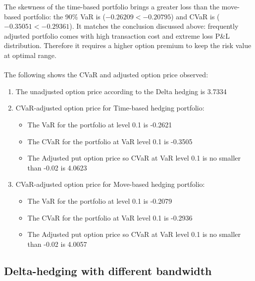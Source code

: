 \documentclass[12pt]{article}
\begin{document}
The skewness of the time-based portfolio brings a greater loss than the move-based portfolio: the 90\% VaR is ($-0.26209< -0.20795$) and CVaR is ($-0.35051<-0.29361$). It matches the conclusion discussed above: frequently adjusted portfolio comes with high transaction cost and extreme loss P\&L 
distribution. Therefore it requires a higher option premium to keep the risk value at optimal range. 
\\\\
The following shows the CVaR and adjusted option price observed: 
\begin{enumerate}

  \item The unadjusted option price according to the Delta hedging is 3.7334
  \item CVaR-adjusted option price for Time-based hedging portfolio:

  \begin{itemize}

    \item The VaR for the portfolio at level 0.1 is -0.2621
    \item The CVaR for the portfolio at VaR level 0.1 is  -0.3505
    \item The Adjusted put option price so CVaR at VaR level 0.1 is no smaller than -0.02 is 4.0623

  \end{itemize}

  \item CVaR-adjusted option price for Move-based hedging portfolio:
  
  \begin{itemize}

    \item The VaR for the portfolio at level 0.1 is -0.2079
    \item The CVaR for the portfolio at VaR level 0.1 is -0.2936
    \item The Adjusted put option price so CVaR at VaR level 0.1 is no smaller than -0.02 is 4.0057

  \end{itemize}

\end{enumerate}

\subsection{Delta-hedging with different bandwidth}
\end{document}
